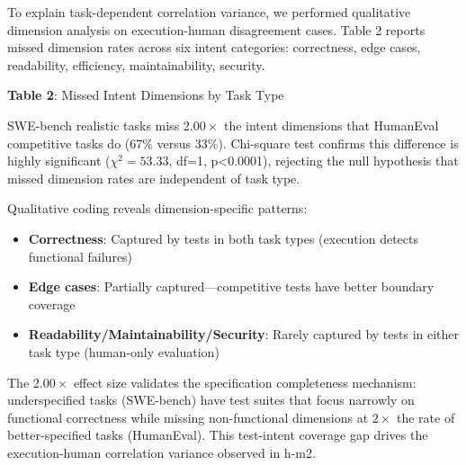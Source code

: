 To explain task-dependent correlation variance, we performed qualitative dimension analysis on execution-human disagreement cases. Table 2 reports missed dimension rates across six intent categories: correctness, edge cases, readability, efficiency, maintainability, security.

\textbf{Table 2}: Missed Intent Dimensions by Task Type

\begin{table}[htbp]
\centering
{}
\end{table}

SWE-bench realistic tasks miss 2.$00\times$ the intent dimensions that HumanEval competitive tasks do (67\% versus 33\%). Chi-square test confirms this difference is highly significant ($\chi^{2}=53.33$, df=1, p<0.0001), rejecting the null hypothesis that missed dimension rates are independent of task type.

Qualitative coding reveals dimension-specific patterns:
\begin{itemize}
\item \textbf{Correctness}: Captured by tests in both task types (execution detects functional failures)
\item \textbf{Edge cases}: Partially captured---competitive tests have better boundary coverage
\item \textbf{Readability/Maintainability/Security}: Rarely captured by tests in either task type (human-only evaluation)
\end{itemize}

The 2.$00\times$ effect size validates the specification completeness mechanism: underspecified tasks (SWE-bench) have test suites that focus narrowly on functional correctness while missing non-functional dimensions at $2\times$ the rate of better-specified tasks (HumanEval). This test-intent coverage gap drives the execution-human correlation variance observed in h-m2.

